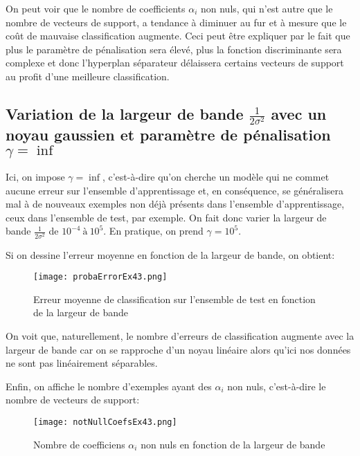 \documentclass{article}
\begin{document}
\begin{multicols}{2}
On peut voir que le nombre de coefficients $\alpha_i$ non nuls, qui n'est autre
que le nombre de vecteurs de support, a tendance à diminuer au fur et à mesure
que le coût de mauvaise classification augmente. Ceci peut être expliquer par le
fait que plus le paramètre de pénalisation sera élevé, plus la fonction
discriminante sera complexe et donc l'hyperplan séparateur délaissera certains
vecteurs de support au profit d'une meilleure classification.

\subsection{Variation de la largeur de bande $\frac{1}{2 \sigma^2}$ avec un
noyau gaussien et paramètre de pénalisation $\gamma = \inf$}\label{subsec:ex43}

Ici, on impose $\gamma = \inf$, c'est-à-dire qu'on cherche un modèle qui ne
commet aucune erreur sur l'ensemble d'apprentissage et, en conséquence, se
généralisera mal à de nouveaux exemples non déjà présents dans l'ensemble
d'apprentissage, ceux dans l'ensemble de test, par exemple.
On fait donc varier la largeur de bande $\frac{1}{2 \sigma^2}$ de
$10^{-4} \ à \ 10^5$. En pratique, on prend $\gamma = 10^5$.

Si on dessine l'erreur moyenne en fonction de la largeur de bande, on obtient:

\begin{figure}[H]
    \begin{center}
        \texttt{[image: probaErrorEx43.png]}
        \centering
        \captionsetup{justification=centering}
        \caption{\label{fig:probaEx43}Erreur moyenne de classification sur
        l'ensemble de test en fonction de la largeur de bande}
    \end{center}
\end{figure}

On voit que, naturellement, le nombre d'erreurs de classification augmente avec
la largeur de bande car on se rapproche d'un noyau linéaire alors qu'ici nos
données ne sont pas linéairement séparables.

Enfin, on affiche le nombre d'exemples ayant des $\alpha_i$ non nuls,
c'est-à-dire le nombre de vecteurs de support:

\begin{figure}[H]
    \begin{center}
        \texttt{[image: notNullCoefsEx43.png]}
        \centering
        \captionsetup{justification=centering}
        \caption{\label{fig:notNullEx43}Nombre de coefficiens $\alpha_i$ non
            nuls en fonction de la largeur de bande}
    \end{center}
\end{figure}


\end{multicols}
\end{document}
